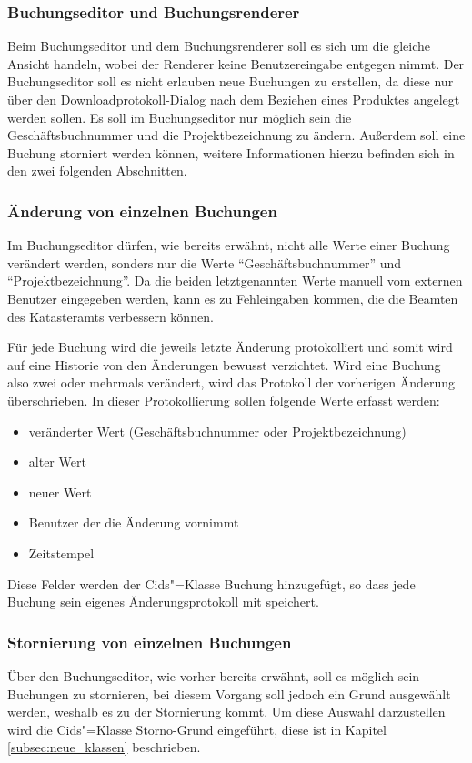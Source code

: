 \subsubsection{Buchungseditor und Buchungsrenderer}
Beim Buchungseditor und dem Buchungsrenderer soll es sich um die gleiche Ansicht handeln, wobei der Renderer keine Benutzereingabe entgegen nimmt.
Der Buchungseditor soll es nicht erlauben neue Buchungen zu erstellen, da diese nur über den Downloadprotokoll-Dialog nach dem Beziehen eines Produktes angelegt werden sollen.
Es soll im Buchungseditor nur möglich sein die Geschäftsbuchnummer und die Projektbezeichnung zu ändern.
Außerdem soll eine Buchung storniert werden können, weitere Informationen hierzu befinden sich in den zwei folgenden Abschnitten.

\subsubsection{Änderung von einzelnen Buchungen} \label{subsubsec:aendern_buchung}
Im Buchungseditor dürfen, wie bereits erwähnt, nicht alle Werte einer Buchung verändert werden, sonders nur die Werte \enquote{Geschäftsbuchnummer} und \enquote{Projektbezeichnung}. Da die beiden letztgenannten Werte manuell vom externen Benutzer eingegeben werden, kann es zu Fehleingaben kommen, die die Beamten des Katasteramts verbessern können.

Für jede Buchung wird die jeweils letzte Änderung protokolliert und somit wird auf eine Historie von den Änderungen bewusst verzichtet. Wird eine Buchung also zwei oder mehrmals verändert, wird das Protokoll der vorherigen Änderung überschrieben.
In dieser Protokollierung sollen folgende Werte erfasst werden:
\begin{itemize}
\item veränderter Wert (Geschäftsbuchnummer oder Projektbezeichnung)
\item alter Wert
\item neuer Wert
\item Benutzer der die Änderung vornimmt
\item Zeitstempel
\end{itemize}
Diese Felder werden der Cids"=Klasse Buchung hinzugefügt, so dass jede Buchung sein eigenes Änderungsprotokoll mit speichert.

\subsubsection{Stornierung von einzelnen Buchungen} \label{subsubsec:storno_buchung}
Über den Buchungseditor, wie vorher bereits erwähnt, soll es möglich sein Buchungen zu stornieren, bei diesem Vorgang soll jedoch ein Grund ausgewählt werden, weshalb es zu der Stornierung kommt. Um diese Auswahl darzustellen wird die Cids"=Klasse Storno-Grund eingeführt, diese ist in Kapitel \ref{subsec:neue_klassen} beschrieben.

